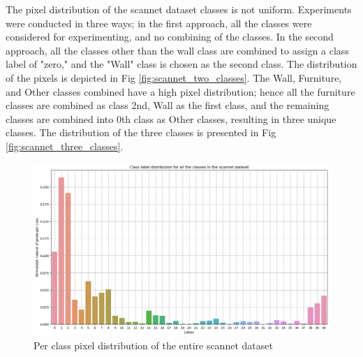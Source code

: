 	The pixel distribution of the scannet dataset classes is not uniform. Experiments were conducted in three ways; in the first approach, all the classes were considered for experimenting, and no combining of the classes. In the second approach, all the classes other than the wall class are combined to assign a class label of "zero," and the "Wall" class is chosen as the second class. The distribution of the pixels is depicted in Fig \ref{fig:scannet_two_classes}.
	The Wall, Furniture, and Other classes combined have a high pixel distribution; hence all the furniture classes are combined as class 2nd, Wall as the first class, and the remaining classes are combined into 0th class as Other classes, resulting in three unique classes. The distribution of the three classes is presented in Fig \ref{fig:scannet_three_classes}.
    
    \begin{figure}
    	\centering
    	\includegraphics[width=13cm]{images/scannet_data_class_distribution.png}
    	\caption{Per class pixel distribution of the entire scannet dataset}
    	\label{fig:scannet_class}
    \end{figure} 
    
